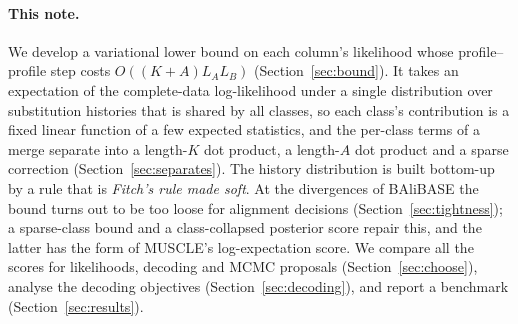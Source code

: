 \documentclass[11pt]{article}
\begin{document}
\paragraph{This note.} We develop a variational lower bound on each column's
likelihood whose profile--profile step costs $O((K+A)L_AL_B)$
(Section~\ref{sec:bound}). It takes an expectation of the complete-data
log-likelihood under a single distribution over substitution histories that is
shared by all classes, so each class's contribution is a fixed linear function
of a few expected statistics, and the per-class terms of a merge separate into
a length-$K$ dot product, a length-$A$ dot product and a sparse correction
(Section~\ref{sec:separates}). The history distribution is built bottom-up by a
rule that is \emph{Fitch's rule made soft}. At the divergences of BAliBASE the
bound turns out to be too loose for alignment decisions
(Section~\ref{sec:tightness}); a sparse-class bound and a class-collapsed
posterior score repair this, and the latter has the form of MUSCLE's
log-expectation score. We compare all the scores for likelihoods, decoding and
MCMC proposals (Section~\ref{sec:choose}), analyse the decoding objectives
(Section~\ref{sec:decoding}), and report a benchmark
(Section~\ref{sec:results}).
\end{document}
